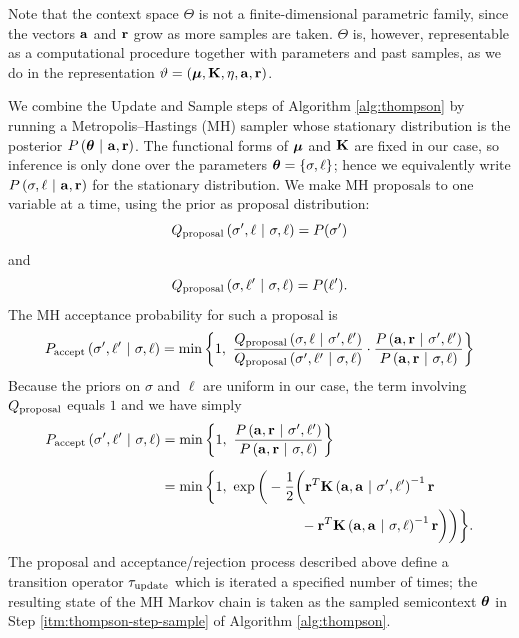 Note that the context space $\Theta$ is not a finite-dimensional parametric
family, since the vectors $\mathbf{a}$ and $\mathbf{r}$ grow as more samples are
taken.  $\Theta$ is, however, representable as a computational
procedure together with parameters and past samples, as we do in the
representation $\vartheta = (\bm{\mu}, \mathbf{K}, \eta, \mathbf{a}, \mathbf{r})$.

We combine the Update and Sample steps of Algorithm \ref{alg:thompson} by
running a Metropolis--Hastings (MH) sampler whose stationary distribution is the
posterior $P\left( \bm{\theta} \ \middle\vert\  \mathbf{a}, \mathbf{r} \right)$.  The functional forms of
$\bm{\mu}$ and $\mathbf{K}$ are fixed in our case, so inference is only done
over the parameters $\bm{\theta} = \left\{ \sigma,\ell \right\}$; hence we equivalently write
$P\left( \sigma,\ell \ \middle\vert\  \mathbf{a}, \mathbf{r} \right)$ for the stationary
distribution.  We make MH proposals to one variable at a time, using the prior
as proposal distribution:
\[
  Q_{\textrm{proposal}}\left( \sigma',\ell \ \middle\vert\  \sigma,\ell \right) = P(\sigma')
\]
and
\[
  Q_{\textrm{proposal}}\left( \sigma,\ell' \ \middle\vert\  \sigma,\ell \right) = P(\ell').
\]
The MH acceptance probability for such a proposal is
\[
  P_{\textrm{accept}}\left( \sigma',\ell' \ \middle\vert\  \sigma,\ell \right)
  =
  \min\left\{ 1,\ \frac{
    Q_{\textrm{proposal}}\left( \sigma,\ell \ \middle\vert\  \sigma',\ell' \right)
    }{
    Q_{\textrm{proposal}}\left( \sigma',\ell' \ \middle\vert\  \sigma,\ell \right)
    }
  \cdot
  \frac{
    P\left( \mathbf{a},\mathbf{r} \ \middle\vert\  \sigma',\ell' \right)
    }{
    P\left( \mathbf{a},\mathbf{r} \ \middle\vert\  \sigma,\ell \right)
    } \right\}
\]
Because the priors on $\sigma$ and $\ell$ are uniform in our case, the term
involving $Q_{\textrm{proposal}}$ equals $1$ and we have simply
\begin{align*}
  P_{\textrm{accept}}\left( \sigma',\ell' \ \middle\vert\  \sigma,\ell \right)
  &=
  \min\left\{ 1,\ \frac{
    P\left( \mathbf{a},\mathbf{r} \ \middle\vert\  \sigma',\ell' \right)
    }{
    P\left( \mathbf{a},\mathbf{r} \ \middle\vert\  \sigma,\ell \right)
    } \right\} \\[2mm]
  &=
  \min\bigg\{1,\ \exp\bigg( -\frac12\bigg(
    \mathbf{r}^T \mathbf{K}\left( \mathbf{a}, \mathbf{a} \ \middle\vert\  \sigma', \ell' \right)^{-1} \mathbf{r} \\
  & \qquad\qquad\qquad\qquad\qquad -
    \mathbf{r}^T \mathbf{K}\left( \mathbf{a}, \mathbf{a} \ \middle\vert\  \sigma, \ell \right)^{-1} \mathbf{r}
  \bigg)\bigg)\bigg\}.
\end{align*}
The proposal and acceptance/rejection process described above define a
transition operator $\tau_{\textrm{update}}$ which is iterated a specified number of
times; the resulting state of the MH Markov chain is taken as the sampled
semicontext $\bm{\theta}$ in Step \ref{itm:thompson-step-sample} of Algorithm
\ref{alg:thompson}.

